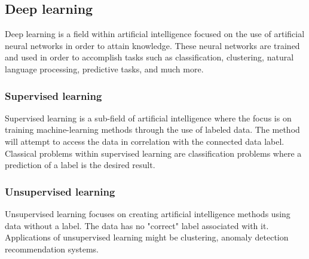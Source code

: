 \subsection{Deep learning}

Deep learning is a field within artificial intelligence focused on the use of artificial neural networks in order to attain knowledge.
These neural networks are trained and used in order to accomplish tasks such as classification, clustering, natural language processing, predictive tasks, and much more.

\subsubsection{Supervised learning}
Supervised learning is a sub-field of artificial intelligence where the focus is on training
machine-learning methods through the use of labeled data.
The method will attempt to access the data in correlation with the connected data label.
Classical problems within supervised learning are classification problems where a prediction of a label is the desired result.

\subsubsection{Unsupervised learning}
Unsupervised learning focuses on creating artificial intelligence methods using data without a label.
The data has no "correct" label associated with it.
Applications of unsupervised learning might be clustering, anomaly detection recommendation systems.

